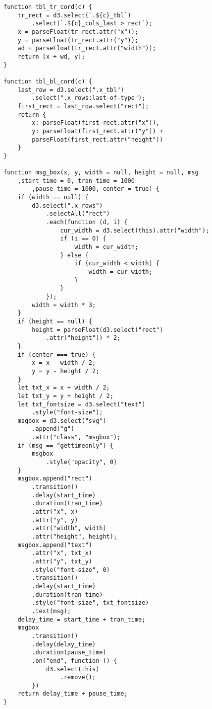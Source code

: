 \begin{lstlisting}
function tbl_tr_cord(c) {
    tr_rect = d3.select(`.${c}_tbl`)
        .select(`.${c}_cols_last > rect`);
    x = parseFloat(tr_rect.attr("x"));
    y = parseFloat(tr_rect.attr("y"));
    wd = parseFloat(tr_rect.attr("width"));
    return [x + wd, y];
}

function tbl_bl_cord(c) {
    last_row = d3.select(".x_tbl")
        .select(".x_rows:last-of-type");
    first_rect = last_row.select("rect");
    return {
        x: parseFloat(first_rect.attr("x")),
        y: parseFloat(first_rect.attr("y")) +
        parseFloat(first_rect.attr("height"))
    }
}

function msg_box(x, y, width = null, height = null, msg
    ,start_time = 0, tran_time = 1000
        ,pause_time = 1000, center = true) {
    if (width == null) {
        d3.select(".x_rows")
            .selectAll("rect")
            .each(function (d, i) {
                cur_width = d3.select(this).attr("width");
                if (i == 0) {
                    width = cur_width;
                } else {
                    if (cur_width < width) {
                        width = cur_width;
                    }
                }
            });
        width = width * 3;
    }
    if (height == null) {
        height = parseFloat(d3.select("rect")
            .attr("height")) * 2;
    }
    if (center === true) {
        x = x - width / 2;
        y = y - height / 2;
    }
    let txt_x = x + width / 2;
    let txt_y = y + height / 2;
    let txt_fontsize = d3.select("text")
        .style("font-size");
    msgbox = d3.select("svg")
        .append("g")
        .attr("class", "msgbox");
    if (msg == "gettimeonly") {
        msgbox
            .style("opacity", 0)
    }
    msgbox.append("rect")
        .transition()
        .delay(start_time)
        .duration(tran_time)
        .attr("x", x)
        .attr("y", y)
        .attr("width", width)
        .attr("height", height);
    msgbox.append("text")
        .attr("x", txt_x)
        .attr("y", txt_y)
        .style("font-size", 0)
        .transition()
        .delay(start_time)
        .duration(tran_time)
        .style("font-size", txt_fontsize)
        .text(msg);
    delay_time = start_time + tran_time;
    msgbox
        .transition()
        .delay(delay_time)
        .duration(pause_time)
        .on("end", function () {
            d3.select(this)
                .remove();
        })
    return delay_time + pause_time;
}


\end{lstlisting}
